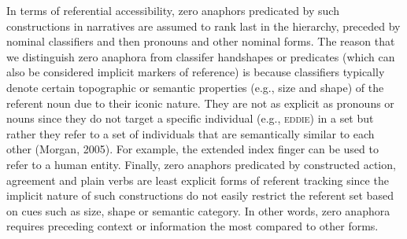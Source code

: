 \documentclass[]{elsarticle} %
\begin{document}
In terms of referential accessibility, zero anaphors predicated by such
constructions in narratives are assumed to rank last in the hierarchy,
preceded by nominal classifiers and then pronouns and other nominal
forms. The reason that we distinguish zero anaphora from classifer
handshapes or predicates (which can also be considered implicit markers
of reference) is because classifiers typically denote certain
topographic or semantic properties (e.g., size and shape) of the
referent noun due to their iconic nature. They are not as explicit as
pronouns or nouns since they do not target a specific individual (e.g.,
\textsc{eddie}) in a set but rather they refer to a set of individuals
that are semantically similar to each other (Morgan, 2005). For example,
the extended index finger can be used to refer to a human entity.
Finally, zero anaphors predicated by constructed action, agreement and
plain verbs are least explicit forms of referent tracking since the
implicit nature of such constructions do not easily restrict the
referent set based on cues such as size, shape or semantic category. In
other words, zero anaphora requires preceding context or information the
most compared to other forms.
\end{document}
